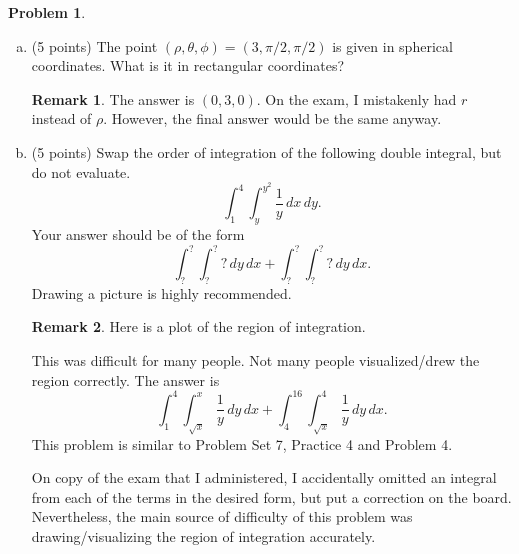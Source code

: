 \documentclass[11pt,oneside]{amsart}
\theoremstyle{definition}
\newtheorem{problem}{Problem}
\newtheorem*{remark}{Remark}
\theoremstyle{plain}
\begin{document}
\begin{problem}\leavevmode
  \begin{enumerate}[(a)]
    \item (5 points) The point $(\rho,\theta,\phi)=(3,\pi/2,\pi/2)$ is given in spherical coordinates. What is it in rectangular coordinates?
    \begin{remark}\color{blue}
      The answer is $(0,3,0)$. On the exam, I mistakenly had $r$ instead of $\rho$. However, the final answer would be the same anyway.
    \end{remark}
    \vfill
    \item (5 points) Swap the order of integration of the following double integral, but do not evaluate.
    \[\int_1^4\int_{y}^{y^2}\frac 1y\,dx\,dy.\]
    Your answer should be of the form
    \[\int_{\boxed{?}}^{\boxed{?}}\int_{\boxed{?}}^{\boxed{?}}\boxed{?}\,dy\,dx+\int_{\boxed{?}}^{\boxed{?}}\int_{\boxed{?}}^{\boxed{?}}\boxed{?}\,dy\,dx.\]
    Drawing a picture is highly recommended.
    \begin{remark}\color{blue}
      Here is a plot of the region of integration.
      \begin{center}
      \end{center}
      This was difficult for many people. Not many people visualized/drew the region correctly. The answer is
      \[\int_1^4\int_{\sqrt x}^x\frac 1y\,dy\,dx+\int_4^{16}\int_{\sqrt x}^4\frac 1y\,dy\,dx.\]
      This problem is similar to Problem Set 7, Practice 4 and Problem 4.

      On copy of the exam that I administered, I accidentally omitted an integral from each of the terms in the desired form, but put a correction on the board. Nevertheless, the main source of difficulty of this problem was drawing/visualizing the region of integration accurately.
    \end{remark}
    \vfill
    \vfill
    \vfill
  \end{enumerate}
\end{problem}
\end{document}

